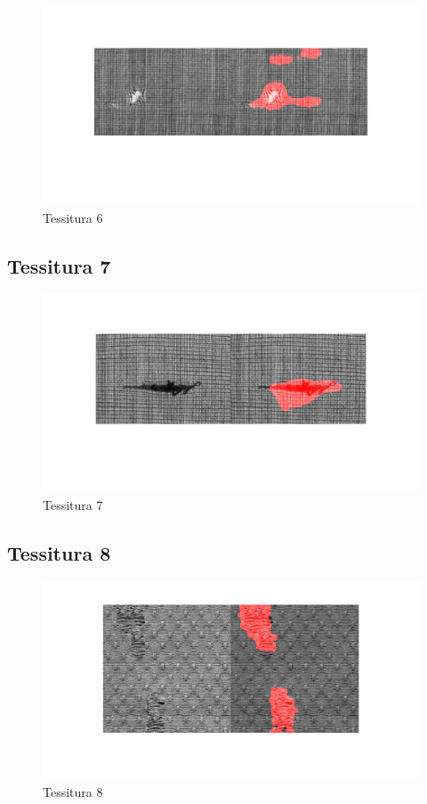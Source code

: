 \documentclass{article}
\begin{document}
\begin{figure}[h!]
	\centering
	\includegraphics[width=\textwidth]{results/res6.jpg}
	\caption{Tessitura 6}
\end{figure}

\subsection{Tessitura 7}

\begin{figure}[h!]
	\centering
	\includegraphics[width=\textwidth]{results/res7.jpg}
	\caption{Tessitura 7}
\end{figure}

\newpage

\subsection{Tessitura 8}

\begin{figure}[h!]
	\centering
	\includegraphics[width=\textwidth]{results/res8.jpg}
	\caption{Tessitura 8}
\end{figure}
\end{document}
